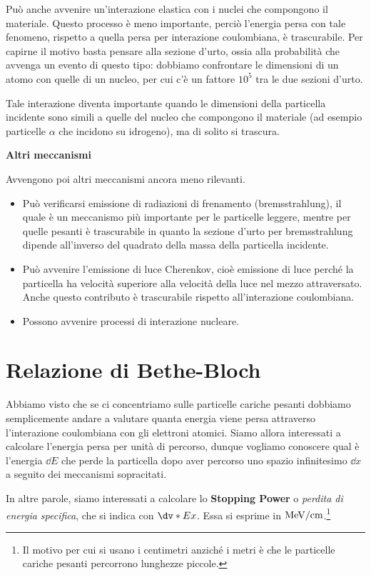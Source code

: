 Può anche avvenire un'interazione elastica con i nuclei che compongono il materiale. Questo processo è meno importante, perciò l'energia persa con tale fenomeno, rispetto a quella persa per interazione coulombiana, è trascurabile. Per capirne il motivo basta pensare alla sezione d'urto, ossia alla probabilità che avvenga un evento di questo tipo: dobbiamo confrontare le dimensioni di un atomo con quelle di un nucleo, per cui c'è un fattore $10^5$ tra le due sezioni d'urto.

Tale interazione diventa importante quando le dimensioni della particella incidente sono simili a quelle del nucleo che compongono il materiale (ad esempio particelle $\alpha$ che incidono su idrogeno), ma di solito si trascura.

\vspace{0.2cm}\textbf{Altri meccanismi}

Avvengono poi altri meccanismi ancora meno rilevanti.
\begin{itemize}
    \item Può verificarsi emissione di radiazioni di frenamento (bremsstrahlung), il quale è un meccanismo più importante per le particelle leggere, mentre per quelle pesanti è trascurabile in quanto la sezione d'urto per bremsstrahlung dipende all'inverso del quadrato della massa della particella incidente.
    \item Può avvenire l'emissione di luce Cherenkov, cioè emissione di luce perché la particella ha velocità superiore alla velocità della luce nel mezzo attraversato. Anche questo contributo è trascurabile rispetto all'interazione coulombiana.
    \item Possono avvenire processi di interazione nucleare.
\end{itemize}

\section{Relazione di Bethe-Bloch}
Abbiamo visto che se ci concentriamo sulle particelle cariche pesanti dobbiamo semplicemente andare a valutare quanta energia viene persa attraverso l'interazione coulombiana con gli elettroni atomici. Siamo allora interessati a calcolare l'energia persa per unità di percorso, dunque vogliamo conoscere qual è l'energia $\dd{E}$ che perde la particella dopo aver percorso uno spazio infinitesimo $\dd{x}$ a seguito dei meccanismi sopracitati.

In altre parole, siamo interessati a calcolare lo \textbf{Stopping Power} o \textit{perdita di energia specifica}, che si indica con $\dv*{E}{x}$. Essa si esprime in $\rm MeV/cm$.\footnote{Il motivo per cui si usano i centimetri anziché i metri è che le particelle cariche pesanti percorrono lunghezze piccole.}

